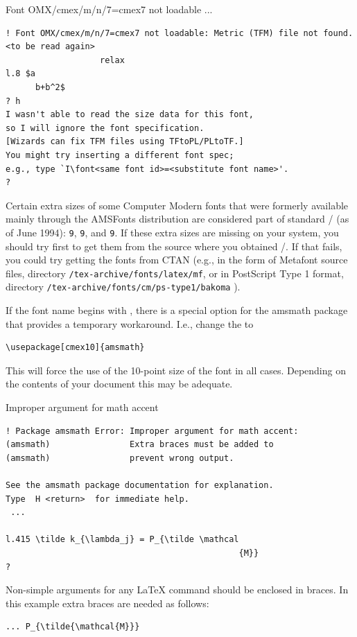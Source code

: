 \documentclass[leqno,titlepage,openany]{amsldoc}[1999/12/13]
\makeatletter
\newcommand{\nipkg}{\textsf}
\newcommand{\nfn}[1]{\texttt{#1}}
\let\oldcs\cs
\def\cs#1{\texorpdfstring{\oldcs{#1}}{\@backslashchar\@backslashchar#1}}
\let\cn\cs
\makeatother
\begin{document}
\enlargethispage{1.5\baselineskip}

\begin{error}{Font OMX/cmex/m/n/7=cmex7 not loadable ...}
\errexa
\begin{verbatim}
! Font OMX/cmex/m/n/7=cmex7 not loadable: Metric (TFM) file not found.
<to be read again>
                   relax
l.8 $a
      b+b^2$
? h
I wasn't able to read the size data for this font,
so I will ignore the font specification.
[Wizards can fix TFM files using TFtoPL/PLtoTF.]
You might try inserting a different font spec;
e.g., type `I\font<same font id>=<substitute font name>'.
?
\end{verbatim}
\errexpl
Certain extra sizes of some Computer Modern fonts that were formerly
available mainly through the AMSFonts
distribution are considered part of standard \latex/ (as of June 1994):
\ndash \texttt{9}, \ndash \texttt{9}, and
\ndash \texttt{9}. If these extra sizes are missing on your
system, you should try first to get them from the source where you
obtained \latex/. If that fails, you could try getting the fonts from
CTAN (e.g., in the form of Metafont source
files, directory \nfn{/tex-archive/fonts/latex/mf}, or in PostScript
Type 1 format, directory
\nfn{/tex-archive/fonts/cm/ps-type1/bakoma}\relax
{}).

If the font name begins with , there is a special option%
 for the \nipkg{amsmath} package that provides a temporary
workaround. I.e., change the \cn{usepackage} to
\begin{verbatim}
\usepackage[cmex10]{amsmath}
\end{verbatim}
This will force the use of the 10-point size of the  font in
all cases. Depending on the contents of your document this may be
adequate.
\end{error}

\enlargethispage{1\baselineskip}
\begin{error}{Improper argument for math accent}
\errexa
\begin{verbatim}
! Package amsmath Error: Improper argument for math accent:
(amsmath)                Extra braces must be added to
(amsmath)                prevent wrong output.

See the amsmath package documentation for explanation.
Type  H <return>  for immediate help.
 ...

l.415 \tilde k_{\lambda_j} = P_{\tilde \mathcal
                                               {M}}
?
\end{verbatim}
\errexpl
Non-simple arguments for any \LaTeX{} command should be enclosed in
braces. In this example extra braces are needed as follows:
\begin{verbatim}
... P_{\tilde{\mathcal{M}}}
\end{verbatim}
\end{error}
\end{document}

